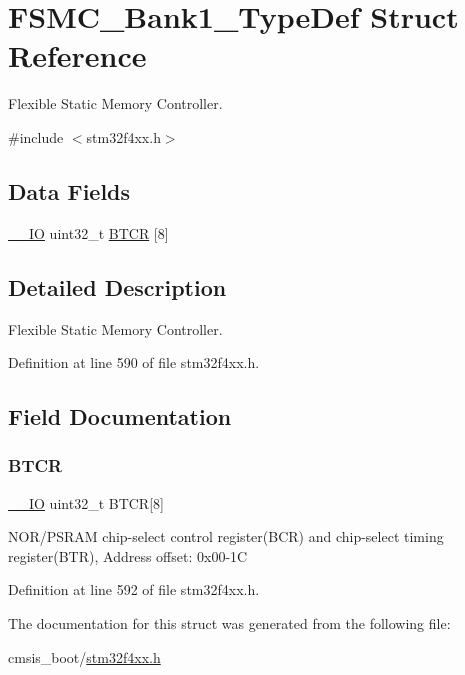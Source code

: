 \hypertarget{struct_f_s_m_c___bank1___type_def}{}\section{F\+S\+M\+C\+\_\+\+Bank1\+\_\+\+Type\+Def Struct Reference}
\label{struct_f_s_m_c___bank1___type_def}


Flexible Static Memory Controller.  




{\ttfamily \#include $<$stm32f4xx.\+h$>$}

\subsection*{Data Fields}
\begin{DoxyCompactItemize}
\item 
\hyperlink{group___c_m_s_i_s__core__definitions_gaec43007d9998a0a0e01faede4133d6be}{\+\_\+\+\_\+\+IO} uint32\+\_\+t \hyperlink{struct_f_s_m_c___bank1___type_def_a80a6708b507f6eecbc10424fdb088b79}{B\+T\+CR} \mbox{[}8\mbox{]}
\end{DoxyCompactItemize}


\subsection{Detailed Description}
Flexible Static Memory Controller. 

Definition at line 590 of file stm32f4xx.\+h.



\subsection{Field Documentation}
\mbox{\label{struct_f_s_m_c___bank1___type_def_a80a6708b507f6eecbc10424fdb088b79}} 
\subsubsection{\texorpdfstring{B\+T\+CR}{BTCR}}
{\footnotesize\ttfamily \hyperlink{group___c_m_s_i_s__core__definitions_gaec43007d9998a0a0e01faede4133d6be}{\+\_\+\+\_\+\+IO} uint32\+\_\+t B\+T\+CR\mbox{[}8\mbox{]}}

N\+O\+R/\+P\+S\+R\+AM chip-\/select control register(\+B\+C\+R) and chip-\/select timing register(\+B\+T\+R), Address offset\+: 0x00-\/1C 

Definition at line 592 of file stm32f4xx.\+h.



The documentation for this struct was generated from the following file\+:\begin{DoxyCompactItemize}
\item 
cmsis\+\_\+boot/\hyperlink{stm32f4xx_8h}{stm32f4xx.\+h}\end{DoxyCompactItemize}
